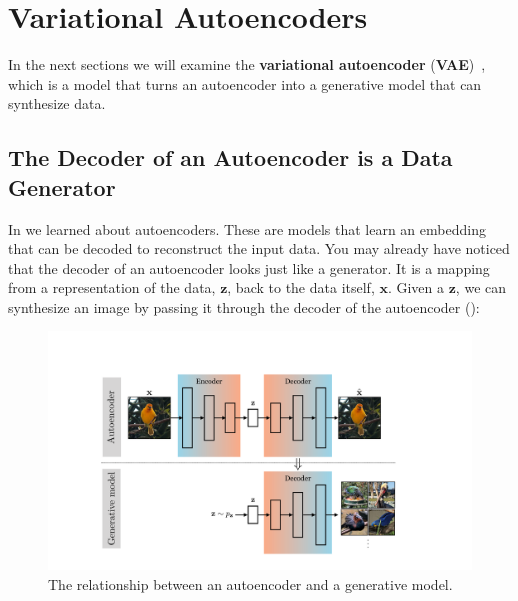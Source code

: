 \section{Variational Autoencoders}\label{sec:generative_modeling_and_representation_learning:VAEs}

In the next sections we will examine the \textbf{variational autoencoder} (\textbf{VAE})~\cite{kingma2013auto,kingma2019introduction}, which is a model that turns an autoencoder into a generative model that can synthesize data.

\subsection{The Decoder of an Autoencoder is a Data Generator}
In \chap{\ref{chapter:representation_learning}} we learned about autoencoders. These are models that learn an embedding that can be decoded to reconstruct the input data. You may already have noticed that the decoder of an autoencoder looks just like a generator. It is a mapping from a representation of the data, $\mathbf{z}$, back to the data itself, $\mathbf{x}$. Given a $\mathbf{z}$, we can synthesize an image by passing it through the decoder of the autoencoder (\fig{\ref{fig:generative_modeling_and_representation_learning:autoencoder_to_generative_model}}):
\begin{figure}[h!]
    \centerline{
    \includegraphics[width=0.8\linewidth]{./figures/generative_modeling_and_representation_learning/autoencoder_to_generative_model.pdf}
    }
    \caption{The relationship between an autoencoder and a generative model.}
    \label{fig:generative_modeling_and_representation_learning:autoencoder_to_generative_model}
\end{figure}

